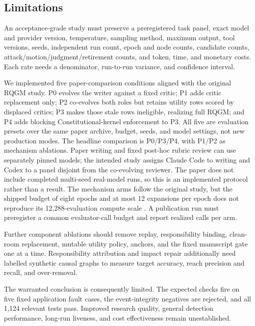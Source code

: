 \subsection{Limitations}\label{sec:eval:limits}

An acceptance-grade study must preserve a preregistered task panel, exact
model and provider version, temperature, sampling method, maximum output,
tool versions, seeds, independent run count, epoch and node counts,
candidate counts, attack/motion/judgment/retirement counts, and token,
time, and monetary costs. Each rate needs a denominator, run-to-run
variance, and confidence interval.

We implemented five paper-comparison conditions aligned with the original
RQGM study. P0 evolves the writer against a fixed critic; P1 adds critic
replacement only; P2 co-evolves both roles but retains utility rows scored
by displaced critics; P3 makes those stale rows ineligible, realizing full
RQGM; and P4 adds blocking Constitutional-kernel enforcement to P3. All
five are evaluation presets over the same paper archive, budget, seeds,
and model settings, not new production modes. The headline comparison is
P0/P3/P4, with P1/P2 as mechanism ablations. Paper writing and fixed
post-hoc rubric review can use separately pinned models; the intended
study assigns Claude Code to writing and Codex to a panel disjoint from
the co-evolving reviewer. The paper does not include completed multi-seed
real-model runs, so this is an implemented protocol rather than a result.
The mechanism arms follow the original study, but the shipped budget of
eight epochs and at most 12 expansions per epoch does not reproduce its
12,288-evaluation compute scale \cite{iacob2026red}. A publication run
must preregister a common evaluator-call budget and report realized calls
per arm.

Further component ablations should remove replay, responsibility binding,
clean-room replacement, mutable utility policy, anchors, and the fixed
manuscript gate one at a time. Responsibility attribution and impact
repair additionally need labelled synthetic causal graphs to measure
target accuracy, reach precision and recall, and over-removal.

The warranted conclusion is consequently limited. The expected checks
fire on five fixed application fault cases, the event-integrity negatives
are rejected, and all 1,124 relevant tests pass.
Improved research quality, general detection performance, long-run
liveness, and cost effectiveness remain unestablished.
